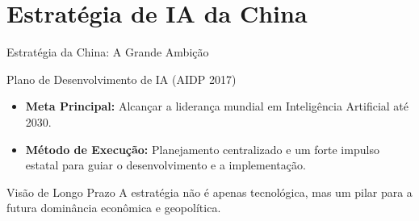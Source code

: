 \documentclass[aspectratio=169,12pt]{beamer}
\begin{document}
\section{Estratégia de IA da China}


\begin{frame}{Estratégia da China: A Grande Ambição}
    \begin{block}{Plano de Desenvolvimento de IA (AIDP 2017)}
        \begin{itemize}
            \item \textbf{Meta Principal:} Alcançar a liderança mundial em Inteligência Artificial até 2030.
            \item \textbf{Método de Execução:} Planejamento centralizado e um forte impulso estatal para guiar o desenvolvimento e a implementação.
        \end{itemize}
    \end{block}
    
    \begin{alertblock}{Visão de Longo Prazo}
        A estratégia não é apenas tecnológica, mas um pilar para a futura dominância econômica e geopolítica.
    \end{alertblock}
\end{frame}
\end{document}
